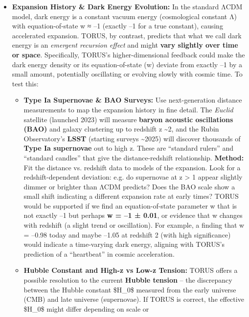 \begin{itemize}
\item
  \textbf{Expansion History \& Dark Energy Evolution:} In the standard
  ΛCDM model, dark energy is a constant vacuum energy (cosmological
  constant Λ) with equation-of-state w ≈ --1 (exactly --1 for a true
  constant), causing accelerated expansion. TORUS, by contrast, predicts
  that what we call dark energy is an \emph{emergent recursion effect}
  and might \textbf{vary slightly over time or space}​. Specifically,
  TORUS's higher-dimensional feedback could make the dark energy density
  or its equation-of-state (w) deviate from exactly --1 by a small
  amount, potentially oscillating or evolving slowly with cosmic time​.
  To test this:

  \begin{itemize}
  \item
    \textbf{Type Ia Supernovae \& BAO Surveys:} Use next-generation
    distance measurements to map the expansion history in fine detail.
    The \emph{Euclid} satellite (launched 2023) will measure
    \textbf{baryon acoustic oscillations (BAO)} and galaxy clustering up
    to redshift z \textasciitilde{}2, and the Rubin Observatory's
    \textbf{LSST} (starting surveys \textasciitilde{}2025) will discover
    thousands of \textbf{Type Ia supernovae} out to high z. These are
    ``standard rulers'' and ``standard candles'' that give the
    distance-redshift relationship. \textbf{Method:} Fit the distance
    vs. redshift data to models of the expansion. Look for a
    redshift-dependent deviation: e.g. do supernovae at z \textgreater{}
    1 appear slightly dimmer or brighter than ΛCDM predicts? Does the
    BAO scale show a small shift indicating a different expansion rate
    at early times? TORUS would be supported if we find an
    equation-of-state parameter w that is not exactly --1 but perhaps
    \textbf{w = --1 ± 0.01}, or evidence that w changes with redshift (a
    slight trend or oscillation)​. For example, a finding that w =
    --0.98 today and maybe --1.05 at redshift 2 (with high significance)
    would indicate a time-varying dark energy, aligning with TORUS's
    prediction of a ``heartbeat'' in cosmic acceleration​.
  \item
    \textbf{Hubble Constant and High-z vs Low-z Tension:} TORUS offers a
    possible resolution to the current \textbf{Hubble tension} -- the
    discrepancy between the Hubble constant \$H\_0\$ measured from the
    early universe (CMB) and late universe (supernovae)​. If TORUS is
    correct, the effective \$H\_0\$ might differ depending on scale or

\end{itemize}
\end{itemize}
